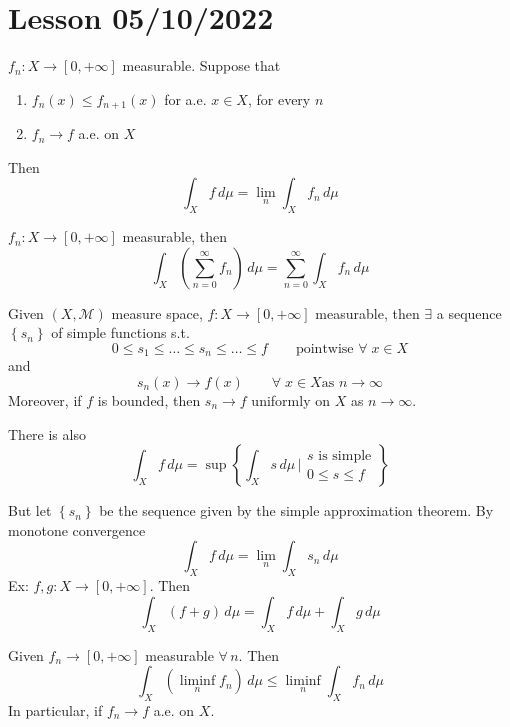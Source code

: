 \section{Lesson 05/10/2022}
\begin{theorem}
    \(f_n : X \to [0, +\infty]\) measurable. Suppose that 
    \begin{enumerate}
        \item \(f_n(x) \leq f_{n+1}(x)\) for a.e. \(x \in X\), for every \(n\)
        \item \(f_n \to f\) a.e. on \(X\) 
    \end{enumerate}
    Then 
    \[
        \int_X f \, d\mu = \lim_n \int_X f_n \, d\mu
    \]
\end{theorem}
\begin{corollary}
    \(f_n : X \to [0, +\infty]\) measurable, then 
    \[
        \int_X \left( \sum_{n=0}^{\infty} f_n\right) \, d\mu = \sum_{n=0}^{\infty} \int_X f_n \, d\mu
    \]
\end{corollary}
\begin{theorem}
    Given \((X, \mathcal{M})\) measure space, \(f: X \to [0, +\infty]\) measurable, then \(\exists\) a sequence \(\left\{ s_n \right\}\) of simple functions s.t. 
    \[
        0 \leq s_1 \leq \ldots \leq s_n \leq \ldots \leq f \qquad \text{pointwise } \forall \; x \in X
    \]
    and 
    \[
        s_n (x) \to f(x) \qquad \forall \; x \in X \text{as } n \to \infty 
    \]
    Moreover, if \(f\) is bounded, then \(s_n \to f\) uniformly on \(X\) as \(n \to \infty\).
\end{theorem}
\begin{remark}
    There is also
    \[
        \int_X f \, d\mu = \sup \left\{ \int_X s \, d\mu \, \bigg\vert \begin{array}{l}s\text{ is simple} \\ 0 \leq s \leq f \end{array}\right\}
    \]
\end{remark}
But let \(\left\{ s_n \right\}\) be the sequence given by the simple approximation theorem. By monotone convergence 
\[
    \int_X f \, d\mu = \lim_n \int_X s_n \, d\mu
\]
Ex: \(f, g : X \to [0, +\infty]\). Then 
\[
    \int_X (f+g) \, d\mu = \int_X f \, d\mu + \int_X g \, d\mu
\]
\begin{lemma}
    Given \(f_n \to [0, +\infty]\) measurable \(\forall \, n\). Then 
    \[
        \int_X (\liminf_n f_n) \, d\mu \leq \liminf_n \int_X f_n \, d\mu
    \]
    In particular, if \(f_n \to f\) a.e. on \(X\).
\end{lemma}
